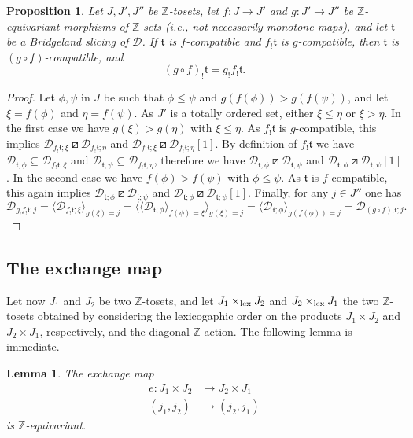 \documentclass{article}
\newtheorem{prop}[thm]{Proposition}
\newtheorem{lem}[thm]{Lemma}
\theoremstyle{definition}
\newcommand{\Z}{\mathbb{Z}}
\newcommand{\tee}{\mathfrak{t}}
\newcommand{\orth}{\boxslash}
\newcommand{\lex}{\times_{\textnormal{lex}}}
\begin{document}
\begin{prop}\label{functoriality}
Let $J,J',J''$ be $\Z$-tosets, let $f\colon J\to J'$ and $g\colon J'\to J''$ be $\Z$-equivariant morphisms of $\Z$-sets (i.e., not necessarily monotone maps), and let $\tee$ be a Bridgeland slicing of $\mathscr{D}$. If $\tee$ is $f$-compatible and $f_!\tee$ is $g$-compatible, then $\tee$ is $(g\circ f)$-compatible, and
\[
(g\circ f)_!\tee= g_!f_!\tee.
\]
\end{prop}
\begin{proof}
Let $\phi,\psi$ in $J$ be such that $\phi\leq \psi$ and $g(f(\phi))>g(f(\psi))$, and let $\xi=f(\phi)$ and $\eta=f(\psi)$. As $J'$ is a totally ordered set, either $\xi\leq \eta$ or $\xi>\eta$. In the first case we have $g(\xi)>g(\eta)$ with $\xi\leq \eta$. As $f_!\tee$ is $g$-compatible, this implies $\mathscr{D}_{f_!\tee; \xi}\orth \mathscr{D}_{f_!\tee;\eta}$ and $\mathscr{D}_{f_!\tee; \xi}\orth \mathscr{D}_{f_!\tee;\eta}[1]$. By definition of $f_!\tee$ we have $\mathscr{D}_{\tee; \phi}\subseteq \mathscr{D}_{f_!\tee; \xi}$ and $\mathscr{D}_{\tee; \psi}\subseteq \mathscr{D}_{f_!\tee; \eta}$, therefore we have $\mathscr{D}_{\tee; \phi}\orth \mathscr{D}_{\tee;\psi}$ and $\mathscr{D}_{\tee; \phi}\orth \mathscr{D}_{\tee;\psi}[1]$. In the second case we have $f(\phi)>f(\psi)$ with $\phi\leq \psi$. As $\tee$ is $f$-compatible, this again
implies $\mathscr{D}_{\tee; \phi}\orth \mathscr{D}_{\tee;\psi}$ and $\mathscr{D}_{\tee; \phi}\orth \mathscr{D}_{\tee;\psi}[1]$. Finally, for any $j\in J''$ one has
\[
\mathscr{D}_{g_!f_!\tee;j}=\langle \mathscr{D}_{f_!\tee;\xi}\rangle_{g(\xi)=j}=\langle\langle \mathscr{D}_{\tee;\phi}\rangle_{f(\phi)=\xi}\rangle_{g(\xi)=j}=\langle \mathscr{D}_{\tee;\phi}\rangle_{g(f(\phi))=j}=\mathscr{D}_{(g\circ f)_!\tee;j}.
\]
\end{proof}

\subsection{The exchange map}

Let now $J_1$ and $J_2$ be two $\mathbb{Z}$-tosets, and let $J_1 \lex J_2$ and $J_2 \lex J_1$ the two $\Z$-tosets obtained by considering the lexicogaphic order on the products $J_1\times J_2$ and $J_2\times J_1$, respectively, and the diagonal $\Z$ action. The following lemma is immediate.
\begin{lem}\label{exchange}
The exchange map
\begin{align*}
e\colon J_1\times J_2&\to J_2\times J_1\\
(j_1,j_2)&\mapsto (j_2,j_1)
\end{align*}
is $\Z$-equivariant.
\end{lem}
\end{document}
